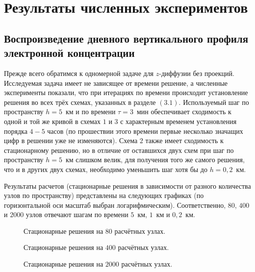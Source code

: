 \documentclass[14pt, a4paper, fleqn]{extarticle}
\begin{document}
\section{Результаты численных экспериментов}

\subsection{Воспроизведение дневного вертикального профиля электронной концентрации}

Прежде всего обратимся к одномерной задаче для $z$-диффузии без проекций. Исследуемая задача имеет не зависящее от времени решение, а численные эксперименты показали, что при итерациях по времени происходит установление решения во всех трёх схемах, указанных в разделе $(3.1)$. Используемый шаг по пространству $h = 5$~км и по времени $\tau = 3$~мин обеспечивает сходимость к одной и той же кривой в схемах $1$ и $3$ с характерным временем установления порядка $4-5$ часов (по прошествии этого времени первые несколько значащих цифр в решении уже не изменяются). Схема $2$ также имеет сходимость к стационарному решению, но в отличие от оставшихся двух схем при шаг по пространству $h=5$~км слишком велик, для получения того же самого решения, что и в других двух схемах, необходимо уменьшить шаг хотя бы до $h = 0{,}2$~км.

Результаты расчетов (стационарные решения в зависимости от разного количества узлов по пространству) представлены на следующих графиках (по горизонтальной оси масштаб выбран логарифмическим). Соответственно, $80$, $400$ и $2000$ узлов отвечают шагам по времени $5$~км, $1$~км и $0{,}2$~км.
 
\begin{figure}[H]
\caption{Стационарные решения на $80$ расчётных узлах.}
\end{figure}

\begin{figure}[H]
\caption{Стационарные решения на $400$ расчётных узлах.}
\end{figure}

\begin{figure}[H]
\caption{Стационарные решения на $2000$ расчётных узлах.}
\end{figure}
\end{document}
